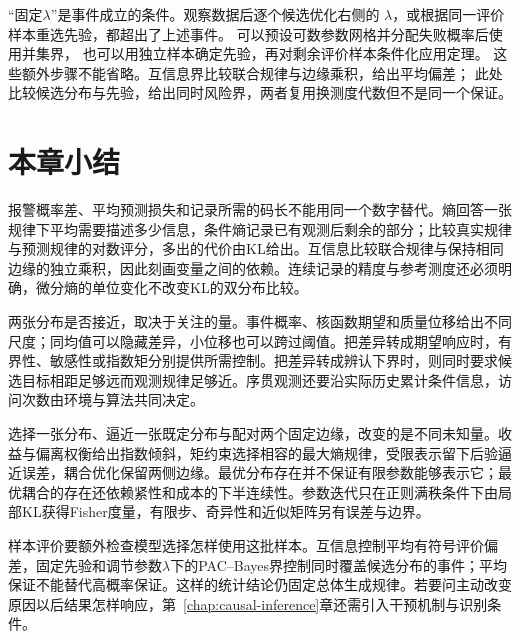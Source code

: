 “固定\(\lambda\)”是事件成立的条件。观察数据后逐个候选优化右侧的
\(\lambda\)，或根据同一评价样本重选先验，都超出了上述事件。
可以预设可数参数网格并分配失败概率后使用并集界，
也可以用独立样本确定先验，再对剩余评价样本条件化应用定理。
这些额外步骤不能省略。互信息界比较联合规律与边缘乘积，给出平均偏差；
此处比较候选分布与先验，给出同时风险界，两者复用换测度代数但不是同一个保证。

\section{本章小结}
\label{sec:information-theory-statistical-geometry-summary}

报警概率差、平均预测损失和记录所需的码长不能用同一个数字替代。熵回答一张规律下平均需要描述多少信息，条件熵记录已有观测后剩余的部分；比较真实规律与预测规律的对数评分，多出的代价由KL给出。互信息比较联合规律与保持相同边缘的独立乘积，因此刻画变量之间的依赖。连续记录的精度与参考测度还必须明确，微分熵的单位变化不改变KL的双分布比较。

两张分布是否接近，取决于关注的量。事件概率、核函数期望和质量位移给出不同尺度；同均值可以隐藏差异，小位移也可以跨过阈值。把差异转成期望响应时，有界性、敏感性或指数矩分别提供所需控制。把差异转成辨认下界时，则同时要求候选目标相距足够远而观测规律足够近。序贯观测还要沿实际历史累计条件信息，访问次数由环境与算法共同决定。

选择一张分布、逼近一张既定分布与配对两个固定边缘，改变的是不同未知量。收益与偏离权衡给出指数倾斜，矩约束选择相容的最大熵规律，受限表示留下后验逼近误差，耦合优化保留两侧边缘。最优分布存在并不保证有限参数能够表示它；最优耦合的存在还依赖紧性和成本的下半连续性。参数迭代只在正则满秩条件下由局部KL获得Fisher度量，有限步、奇异性和近似矩阵另有误差与边界。

样本评价要额外检查模型选择怎样使用这批样本。互信息控制平均有符号评价偏差，固定先验和调节参数\(\lambda\)下的PAC--Bayes界控制同时覆盖候选分布的事件；平均保证不能替代高概率保证。这样的统计结论仍固定总体生成规律。若要问主动改变原因以后结果怎样响应，第~\ref{chap:causal-inference}章还需引入干预机制与识别条件。
